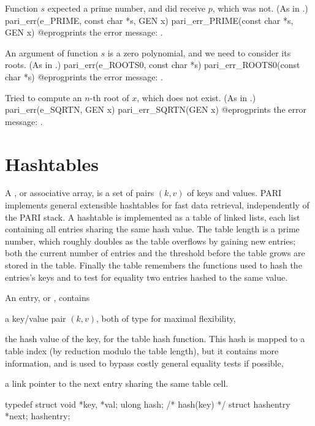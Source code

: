  Function $s$ expected a prime number, and did receive $p$,
which was not. (As in .)
\bprog
  pari_err(e_PRIME, const char *s, GEN x)
  pari_err_PRIME(const char *s, GEN x)
@eprog\noindent prints the error message: .

 An argument of function $s$ is a zero polynomial, and
we need to consider its roots. (As in .)
\bprog
  pari_err(e_ROOTS0, const char *s)
  pari_err_ROOTS0(const char *s)
@eprog\noindent prints the error message: .

 Tried to compute an $n$-th root of $x$, which does not exist.
(As in .)
\bprog
  pari_err(e_SQRTN, GEN x)
  pari_err_SQRTN(GEN x)
@eprog\noindent prints the error message: .

\section{Hashtables}
A , or associative array, is a set of pairs $(k,v)$ of keys
and values. PARI implements general extensible hashtables for fast data
retrieval, independently of the PARI stack. A hashtable is implemented as a
table of linked lists, each list containing all entries sharing the same hash
value. The table length is a prime number, which roughly doubles as the table
overflows by gaining new entries; both the current number of entries and the
threshold before the table grows are stored in the table. Finally the table
remembers the functions used to hash the entries's keys and to test for
equality two entries hashed to the same value.

An entry, or , contains

\item a key/value pair $(k,v)$, both of type  for maximal
flexibility,

\item the hash value of the key, for the table hash function. This hash is
mapped to a table index (by reduction modulo the table length), but it
contains more information, and is used to bypass costly general equality
tests if possible,

\item a link pointer to the next entry sharing the same table cell.

\bprog
typedef struct {
  void *key, *val;
  ulong hash; /* hash(key) */
  struct hashentry *next;
} hashentry;

